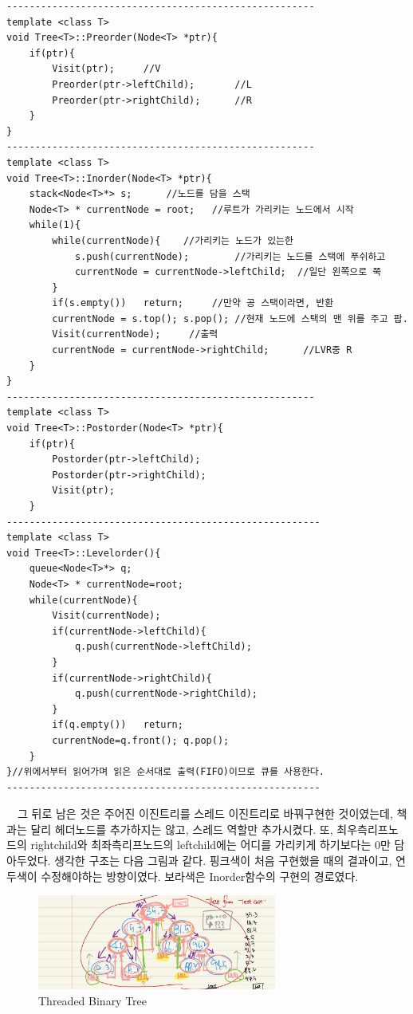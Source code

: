 \documentclass[a4paper,11pt]{article}
\begin{document}
\begin{Verbatim}
------------------------------------------------------
template <class T>
void Tree<T>::Preorder(Node<T> *ptr){
    if(ptr){
        Visit(ptr);		//V
        Preorder(ptr->leftChild);		//L
        Preorder(ptr->rightChild);		//R
    }
}
------------------------------------------------------
template <class T>
void Tree<T>::Inorder(Node<T> *ptr){
    stack<Node<T>*> s;		//노드를 담을 스택
    Node<T> * currentNode = root;	//루트가 가리키는 노드에서 시작			
    while(1){
        while(currentNode){    //가리키는 노드가 있는한 
            s.push(currentNode);		//가리키는 노드를 스택에 푸쉬하고
            currentNode = currentNode->leftChild;  //일단 왼쪽으로 쭉		
        }
        if(s.empty())   return;		//만약 공 스택이라면, 반환
        currentNode = s.top(); s.pop();	//현재 노드에 스택의 맨 위를 주고 팝.
        Visit(currentNode);		//출력
        currentNode = currentNode->rightChild;		//LVR중 R
    }
}
------------------------------------------------------
template <class T>
void Tree<T>::Postorder(Node<T> *ptr){
    if(ptr){
        Postorder(ptr->leftChild);
        Postorder(ptr->rightChild);
        Visit(ptr);
    }
-------------------------------------------------------    
template <class T>
void Tree<T>::Levelorder(){
    queue<Node<T>*> q;
    Node<T> * currentNode=root;
    while(currentNode){
        Visit(currentNode);
        if(currentNode->leftChild){
            q.push(currentNode->leftChild);
        }
        if(currentNode->rightChild){
            q.push(currentNode->rightChild);
        }
        if(q.empty())   return;
        currentNode=q.front(); q.pop(); 
    }
}//위에서부터 읽어가며 읽은 순서대로 출력(FIFO)이므로 큐를 사용한다.
-------------------------------------------------------
\end{Verbatim}
\ \ 그 뒤로 남은 것은 주어진 이진트리를 스레드 이진트리로 바꿔구현한 것이였는데, 책과는 달리 헤더노드를 추가하지는 않고, 스레드 역할만 추가시켰다. 또, 최우측리프노드의 rightchild와 최좌측리프노드의 leftchild에는 어디를 가리키게 하기보다는 0만 담아두었다. 생각한 구조는 다음 그림과 같다. 핑크색이 처음 구현했을 때의 결과이고, 연두색이 수정해야하는 방향이였다. 보라색은 Inorder함수의 구현의 경로였다.\\
 \begin{figure}[h]
\begin{center}
\includegraphics[width=0.7\textwidth]{bt_struct}
\caption{Threaded Binary Tree}
\label{fig:fig2}
\end{center}
\end{figure}
\end{document}
